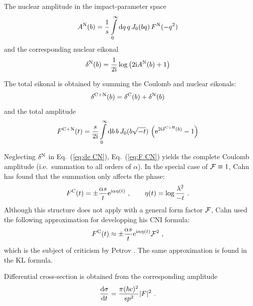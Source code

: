 \documentclass[pdftex,twocolumn,epjc3]{svjour3}
\def\d{{\rm d}}
\def\e{{\rm e}}
\def\I{{\rm i}}
\begin{document}
The nuclear amplitude in the impact-parameter space
\begin{equation}
A^{\rm N}(b) = {1\over s} \int\limits_0^\infty \d q\, q\, J_0(bq)\, F^{\rm N}(-q^2)
\label{eq:A N}
\end{equation}
and the corresponding nuclear eikonal
\begin{equation}
\delta^{\rm N}(b) = {1\over 2\I} \log\left( 2\I A^{\rm N}(b) + 1\right)
\label{eq:de N}
\end{equation}

The total eikonal is obtained by summing the Coulomb and nuclear eikonals:
\begin{equation}
\delta^{\rm C+N}(b) = \delta^{\rm C}(b) + \delta^{\rm N}(b)
\label{eq:de CN}
\end{equation}
and the total amplitude
\begin{equation}
F^{\rm C+N}(t) = {s\over 2\I} \int
\limits
_0^\infty 
\d b\, b\,J_0(b\sqrt{-t})\,\left( \e^{2\I \delta^{\rm C+H}(b)} - 1 \right)
\label{eq:F CN}
\end{equation}

Neglecting $\delta^{\rm N}$ in Eq.~(\ref{eq:de CN}), Eq.~(\ref{eq:F CN}) yields the complete Coulomb amplitude (i.e.~summation to all orders of $\alpha$). In the special case of ${\cal F} \equiv 1$, Cahn has found that the summation only affects the phase:
\begin{equation}
F^{\rm C}(t) = \pm {\alpha s\over t} \e^{\I\alpha \eta(t)}\ ,\qquad \eta(t) = \log {\lambda^2\over -t}\ .
\label{eq:F C comp}
\end{equation}
Although this structure does not apply with a general form factor ${\cal F}$, Cahn used the following approximation for developping his CNI formula:
\begin{equation}
F^{\rm C}(t) \approx \pm {\alpha s\over t} \e^{\I\alpha \eta(t)} {\cal F}^2  \ ,
\label{eq:F C comp ff}
\end{equation}
which is the subject of criticism by Petrov \cite{petrov2018}. The same approximation is found in the KL formula.

Differential cross-section is obtained from the corresponding amplitude
\begin{equation}
{\d\sigma\over\d t} = {\pi(\hbar c)^2\over s p^2} |F|^2\ .
\label{eq:cs}
\end{equation}




\end{document}
